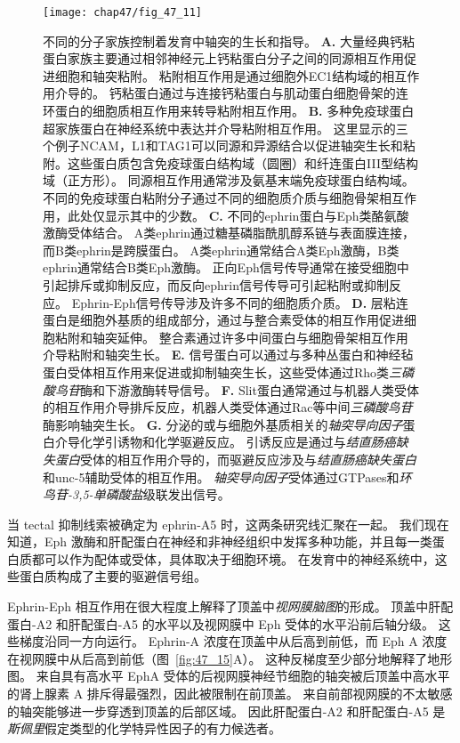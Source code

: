 \begin{figure}[htbp]
	\centering
	\texttt{[image: chap47/fig\_47\_11]}
	\caption{不同的分子家族控制着发育中轴突的生长和指导。
		\textbf{A.} 大量经典钙粘蛋白家族主要通过相邻神经元上钙粘蛋白分子之间的同源相互作用促进细胞和轴突粘附。
		粘附相互作用是通过细胞外EC1结构域的相互作用介导的。
		钙粘蛋白通过与连接钙粘蛋白与肌动蛋白细胞骨架的连环蛋白的细胞质相互作用来转导粘附相互作用。
		\textbf{B.} 多种免疫球蛋白超家族蛋白在神经系统中表达并介导粘附相互作用。
		这里显示的三个例子NCAM，L1和TAG1可以同源和异源结合以促进轴突生长和粘附。这些蛋白质包含免疫球蛋白结构域（圆圈）和纤连蛋白III型结构域（正方形）。
		同源相互作用通常涉及氨基末端免疫球蛋白结构域。
		不同的免疫球蛋白粘附分子通过不同的细胞质介质与细胞骨架相互作用，此处仅显示其中的少数。
		\textbf{C.} 不同的ephrin蛋白与Eph类酪氨酸激酶受体结合。
		A类ephrin通过糖基磷脂酰肌醇系链与表面膜连接，而B类ephrin是跨膜蛋白。
		A类ephrin通常结合A类Eph激酶，B类ephrin通常结合B类Eph激酶。
		正向Eph信号传导通常在接受细胞中引起排斥或抑制反应，而反向ephrin信号传导可引起粘附或抑制反应。
		Ephrin-Eph信号传导涉及许多不同的细胞质介质。
		\textbf{D.} 层粘连蛋白是细胞外基质的组成部分，通过与整合素受体的相互作用促进细胞粘附和轴突延伸。
		整合素通过许多中间蛋白与细胞骨架相互作用介导粘附和轴突生长。
		\textbf{E.} 信号蛋白可以通过与多种丛蛋白和神经毡蛋白受体相互作用来促进或抑制轴突生长，这些受体通过Rho类\textit{三磷酸鸟苷}酶和下游激酶转导信号。
		\textbf{F.} Slit蛋白通常通过与机器人类受体的相互作用介导排斥反应，机器人类受体通过Rac等中间\textit{三磷酸鸟苷}酶影响轴突生长。
		\textbf{G.} 分泌的或与细胞外基质相关的\textit{轴突导向因子}蛋白介导化学引诱物和化学驱避反应。
		引诱反应是通过与\textit{结直肠癌缺失蛋白}受体的相互作用介导的，而驱避反应涉及与\textit{结直肠癌缺失蛋白}和unc-5辅助受体的相互作用。
		\textit{轴突导向因子}受体通过GTPases和\textit{环鸟苷-3,5-单磷酸盐}级联发出信号。}
	\label{fig:47_11}
\end{figure}


当 tectal 抑制线索被确定为 ephrin-A5 时，这两条研究线汇聚在一起。
我们现在知道，Eph 激酶和肝配蛋白在神经和非神经组织中发挥多种功能，并且每一类蛋白质都可以作为配体或受体，具体取决于细胞环境。
在发育中的神经系统中，这些蛋白质构成了主要的驱避信号组。


Ephrin-Eph 相互作用在很大程度上解释了顶盖中\textit{视网膜脑图}的形成。
顶盖中肝配蛋白-A2 和肝配蛋白-A5 的水平以及视网膜中 Eph 受体的水平沿前后轴分级。
这些梯度沿同一方向运行。
Ephrin-A 浓度在顶盖中从后高到前低，而 Eph A 浓度在视网膜中从后高到前低（图~\ref{fig:47_15}A）。
这种反梯度至少部分地解释了地形图。
来自具有高水平 EphA 受体的后视网膜神经节细胞的轴突被后顶盖中高水平的肾上腺素 A 排斥得最强烈，因此被限制在前顶盖。
来自前部视网膜的不太敏感的轴突能够进一步穿透到顶盖的后部区域。
因此肝配蛋白-A2 和肝配蛋白-A5 是\textit{斯佩里}假定类型的化学特异性因子的有力候选者。


